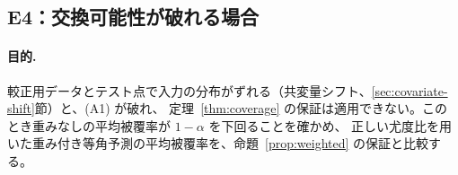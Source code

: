 \documentclass[a4paper,11pt]{jsarticle}
\theoremstyle{definition}
\theoremstyle{plain}
\theoremstyle{remark}
\begin{document}

\subsection{E4：交換可能性が破れる場合}
\label{sec:e4}

\paragraph{目的.}
較正用データとテスト点で入力の分布がずれる（共変量シフト、\ref{sec:covariate-shift}節）と、(A1) が破れ、
定理~\ref{thm:coverage} の保証は適用できない。このとき重みなしの平均被覆率が $1-\alpha$ を下回ることを確かめ、
正しい尤度比を用いた重み付き等角予測の平均被覆率を、命題~\ref{prop:weighted} の保証と比較する。
\end{document}
